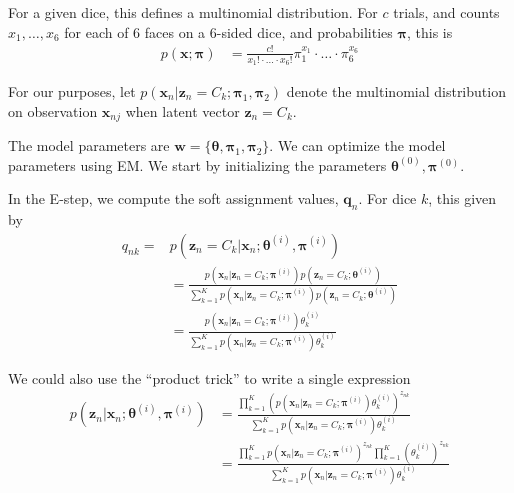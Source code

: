 For a given dice, this defines a multinomial distribution. For $c$ trials, and counts $x_1, \ldots, x_6$ for each of 6 faces on a 6-sided dice, and probabilities $\boldsymbol{\pi}$, this is
%
\begin{align}
  p(\mathbf{x}; \boldsymbol{\pi})&=\frac{c!}{x_1!\cdot \ldots \cdot x_6!}\pi_1^{x_1}\cdot \ldots \cdot \pi_6^{x_6}
\end{align}

For our purposes, let $ p(\textbf{x}_n | \textbf{z}_n = C_k; \boldsymbol{\pi}_1, \boldsymbol{\pi}_2)$ denote the
multinomial distribution on observation $\textbf{x}_{nj}$ when latent vector $\textbf{z}_n = C_k$.

%
%
The model parameters are $\textbf{w} = \{\boldsymbol{\theta}, \boldsymbol{\pi}_1, \boldsymbol{\pi}_2 \}$.
We can optimize the model parameters using EM. We start by initializing the parameters $\boldsymbol{\theta}^{(0)}, \boldsymbol{\pi}^{(0)}$.

In the E-step, we compute the soft assignment values, $\textbf{q}_n$. For dice $k$, this given by
%
\begin{align} \label{E-for-multinomial}
q_{nk} = 
&  p(\textbf{z}_n = C_k | \textbf{x}_n; \boldsymbol{\theta}^{(i)}, \boldsymbol{\pi}^{(i)})
\\
&  =
     \frac{  p(\textbf{x}_n | \textbf{z}_n = C_k; \boldsymbol{\pi}^{(i)})p(\textbf{z}_n = C_k; \boldsymbol{\theta}^{(i)})}
     {\sum_{k=1}^K  p(\textbf{x}_n | \textbf{z}_n = C_k; \boldsymbol{\pi}^{(i)})p(\textbf{z}_n = C_k; \boldsymbol{\theta}^{(i)})}
  \\
  &  =
     \frac{  p(\textbf{x}_n | \textbf{z}_n = C_k; \boldsymbol{\pi}^{(i)})\theta_k^{(i)}}
     {\sum_{k=1}^K  p(\textbf{x}_n | \textbf{z}_n = C_k; \boldsymbol{\pi}^{(i)})\theta_k^{(i)}}
\end{align}


We could also use the ``product trick'' to write a single expression
%
\begin{align*}
  p(\textbf{z}_n  | \textbf{x}_n; \boldsymbol{\theta}^{(i)}, \boldsymbol{\pi}^{(i)})& =
 \frac{  \prod_{k=1}^K\left(  p(\textbf{x}_n | \textbf{z}_n = C_k; \boldsymbol{\pi}^{(i)})\theta_k^{(i)}\right) ^{z_{nk}}}
                                                                                      {\sum_{k=1}^K  p(\textbf{x}_n | \textbf{z}_n = C_k; \boldsymbol{\pi}^{(i)})\theta_k^{(i)}}
  \\
  & =
 \frac{  \prod_{k=1}^K p(\textbf{x}_n | \textbf{z}_n = C_k; \boldsymbol{\pi}^{(i)})^{z_{nk}}\prod_{k=1}^K(\theta_k^{(i)})^{z_{nk}}}
                                                                                      {\sum_{k=1}^K  p(\textbf{x}_n | \textbf{z}_n = C_k; \boldsymbol{\pi}^{(i)})\theta_k^{(i)}}
  \end{align*}

